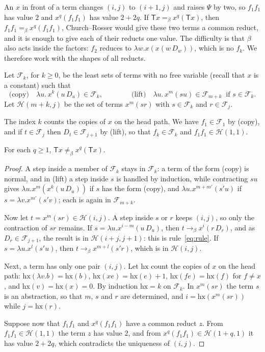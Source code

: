 \documentclass[a4paper,english]{lipics-v2021}
\newcommand{\T}{\mathsf{T}}
\newcommand{\bred}{\to_{\beta}}
\newcommand{\eqb}{=_{\beta}}
\newcommand{\neqb}{\neq_{\beta}}
\newcommand{\Dd}[1]{D_{#1}}
\newcommand{\hx}{\mathrm{hx}}
\newcommand{\Fam}{\mathcal{F}}
\newcommand{\Hst}{\mathcal{H}}
\begin{document}
An $x$ in front of a term changes $(i,j)$ to $(i+1,j)$ and raises $\Psi$ by two, so $f_1f_1$ has value $2$ and $x^q(f_1f_1)$ has value $2+2q$. If $\T x \eqb x^q(\T x)$, then $f_1f_1 \eqb x^q(f_1f_1)$, Church--Rosser would give these two terms a common reduct, and it is enough to give each of their reducts one value. The difficulty is that $\beta$ also acts inside the factors: $f_2$ reduces to $\lambda w.x(x(w\,\Dd{w}))$, which is no $f_k$. We therefore work with the shapes of all reducts.

\begin{definition}\label{def:Tfamily}
Let $\Fam_k$, for $k \geq 0$, be the least sets of terms with no free variable (recall that $x$ is a constant) such that
\[
\text{(copy)}\quad \lambda u.\,x^k(u\,\Dd{u}) \in \Fam_k, \qquad\qquad \text{(lift)}\quad \lambda u.\,x^m(su) \in \Fam_{m+k} \ \text{ if } s \in \Fam_k.
\]
Let $\Hst(m+k,j)$ be the set of terms $x^m(sr)$ with $s \in \Fam_k$ and $r \in \Fam_j$.
\end{definition}

The index $k$ counts the copies of $x$ on the head path. We have $f_1 \in \Fam_1$ by (copy), and if $t \in \Fam_j$ then $\Dd{t} \in \Fam_{j+1}$ by (lift), so that $f_k \in \Fam_k$ and $f_1f_1 \in \Hst(1,1)$.

\begin{proposition}\label{prop:T}
For each $q \geq 1$, $\T x \neqb x^q(\T x)$.
\end{proposition}

\begin{proof}
A step inside a member of $\Fam_k$ stays in $\Fam_k$: a term of the form (copy) is normal, and in (lift) a step inside $s$ is handled by induction, while contracting $su$ gives $\lambda u.x^{m}(x^{k}(u\,\Dd{u}))$ if $s$ has the form (copy), and $\lambda u.x^{m+m'}(s'u)$ if $s = \lambda v.x^{m'}(s'v)$; each is again in $\Fam_{m+k}$.

Now let $t = x^m(sr) \in \Hst(i,j)$. A step inside $s$ or $r$ keeps $(i,j)$, so only the contraction of $sr$ remains. If $s = \lambda u.x^{i-m}(u\,\Dd{u})$, then $t \bred x^{i}(r\,\Dd{r})$, and as $\Dd{r} \in \Fam_{j+1}$, the result is in $\Hst(i+j,j+1)$: this is rule~\eqref{eq:rule}. If $s = \lambda u.x^{l}(s'u)$, then $t \bred x^{m+l}(s'r)$, which is in $\Hst(i,j)$.

Next, a term has only one pair $(i,j)$. Let $\hx$ count the copies of $x$ on the head path: $\hx(\lambda v.b) = \hx(b)$, $\hx(xe) = \hx(e)+1$, $\hx(fe) = \hx(f)$ for $f \neq x$, and $\hx(v) = \hx(x) = 0$. By induction $\hx = k$ on $\Fam_k$. In $x^m(sr)$ the term $s$ is an abstraction, so that $m$, $s$ and $r$ are determined, and $i = \hx(x^m(sr))$ while $j = \hx(r)$.

Suppose now that $f_1f_1$ and $x^q(f_1f_1)$ have a common reduct $z$. From $f_1f_1 \in \Hst(1,1)$ the term $z$ has value $2$, and from $x^q(f_1f_1) \in \Hst(1+q,1)$ it has value $2+2q$, which contradicts the uniqueness of $(i,j)$.
\end{proof}
\end{document}

